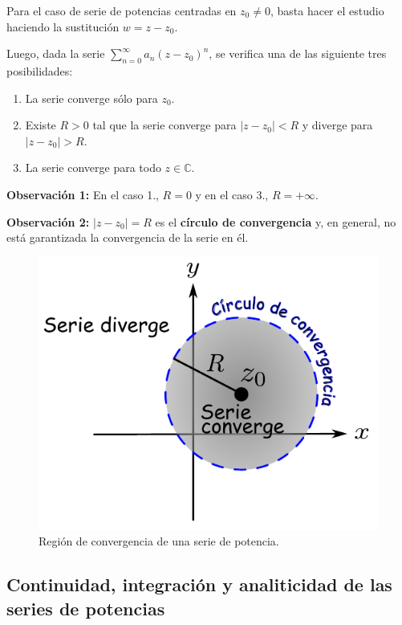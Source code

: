 Para el caso de serie de potencias centradas en $z_0 \neq 0$, basta hacer el estudio haciendo la sustitución $w = z-z_0$.

Luego, dada la serie $\sum\limits_{n=0}^{\infty} a_n(z-z_0)^n$, se verifica una de las siguiente tres posibilidades:
\begin{enumerate}
\item La serie converge sólo para $z_0$.

\item Existe $R > 0$ tal que la serie converge para $|z-z_0| < R$ y diverge para $|z-z_0| > R$.

\item La serie converge para todo $z \in \mathbb{C}$.
\end{enumerate}

\textbf{Observación 1:} En el caso 1., $R = 0$ y en el caso 3., $R =  + \infty$.

\textbf{Observación 2:} $|z-z_0| = R$ es el \textbf{círculo de convergencia} y, en general, no está garantizada la convergencia de la serie en él.

\begin{figure}[H]
    \centering
    \includegraphics[scale = 0.8]{Figuras/ConvergenciaSeriePotencia.pdf}
    \caption{Región de convergencia de una serie de potencia.}
    \label{fig:CVPotencia}
\end{figure}

\subsection*{Continuidad, integración y analiticidad de las series de potencias}

